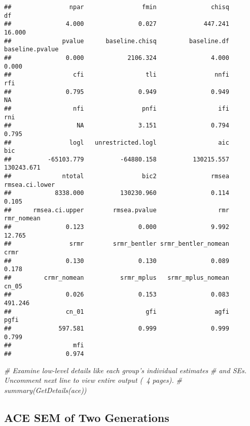 \documentclass[smallextended]{svjour3}       %
\newenvironment{Shaded}{\begin{snugshade}}{\end{snugshade}}
\newcommand{\CommentTok}[1]{\textcolor[rgb]{0.56,0.35,0.01}{\textit{#1}}}
\begin{document}
\begin{verbatim}
##                npar                fmin               chisq                  df 
##               4.000               0.027             447.241              16.000 
##              pvalue      baseline.chisq         baseline.df     baseline.pvalue 
##               0.000            2106.324               4.000               0.000 
##                 cfi                 tli                nnfi                 rfi 
##               0.795               0.949               0.949                  NA 
##                 nfi                pnfi                 ifi                 rni 
##                  NA               3.151               0.794               0.795 
##                logl   unrestricted.logl                 aic                 bic 
##          -65103.779          -64880.158          130215.557          130243.671 
##              ntotal                bic2               rmsea      rmsea.ci.lower 
##            8338.000          130230.960               0.114               0.105 
##      rmsea.ci.upper        rmsea.pvalue                 rmr          rmr_nomean 
##               0.123               0.000               9.992              12.765 
##                srmr        srmr_bentler srmr_bentler_nomean                crmr 
##               0.130               0.130               0.089               0.178 
##         crmr_nomean          srmr_mplus   srmr_mplus_nomean               cn_05 
##               0.026               0.153               0.083             491.246 
##               cn_01                 gfi                agfi                pgfi 
##             597.581               0.999               0.999               0.799 
##                 mfi 
##               0.974
\end{verbatim}

\begin{Shaded}
\begin{Highlighting}[]
\CommentTok{# Examine low-level details like each group's individual estimates}
\CommentTok{#  and SEs.  Uncomment next line to view entire output (~4 pages).}
\CommentTok{# summary(GetDetails(ace))}
\end{Highlighting}
\end{Shaded}

\hypertarget{ace-sem-of-two-generations}{%
\subsection{ACE SEM of Two
Generations}\label{ace-sem-of-two-generations}}
\end{document}
